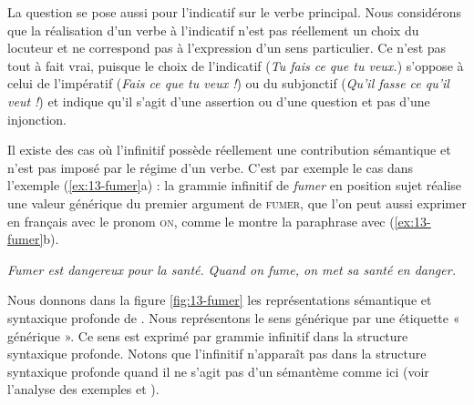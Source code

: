 La question se pose aussi pour l’indicatif sur le verbe principal. Nous considérons que la réalisation d’un verbe à l’indicatif n’est pas réellement un choix du locuteur et ne correspond pas à l’expression d’un sens particulier. Ce n’est pas tout à fait vrai, puisque le choix de l’indicatif (\textit{Tu fais ce que tu veux.}) s’oppose à celui de l’impératif (\textit{Fais ce que tu veux !}) ou du subjonctif (\textit{Qu’il fasse ce qu’il veut !}) et indique qu’il s’agit d’une assertion ou d’une question et pas d’une injonction.

Il existe des cas où l’infinitif possède réellement une contribution sémantique et n’est pas imposé par le régime d’un verbe. C’est par exemple le cas dans l’exemple (\ref{ex:13-fumer}a) : la grammie infinitif de \textit{fumer} en position sujet réalise une valeur générique du premier argument de \textsc{fumer}, que l’on peut aussi exprimer en français avec le pronom \textsc{on}, comme le montre la paraphrase avec (\ref{ex:13-fumer}b). 

\ea\label{ex:13-fumer}
\ea \textit{Fumer est dangereux pour la santé.}
\ex \textit{Quand on fume, on met sa santé en danger.}\z\z

\begin{sloppypar}
Nous donnons dans la figure \ref{fig:13-fumer} les représentations sémantique et syntaxique profonde de . Nous représentons le sens générique par une étiquette « générique ». Ce sens est exprimé par grammie infinitif dans la structure syntaxique profonde. Notons que l’infinitif n’apparaît pas dans la structure syntaxique profonde quand il ne s’agit pas d’un sémantème comme ici (voir l’analyse des exemples  et ).
\end{sloppypar}

